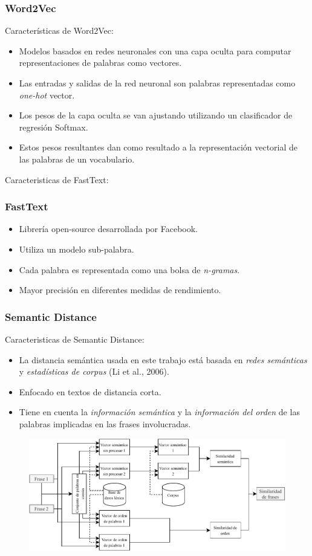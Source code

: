 \begin{frame}
	\frametitle{Word2Vec}
	Características de Word2Vec:
	\bigskip
	\begin{itemize}[<*>]
		\item Modelos basados en redes neuronales con una capa oculta para computar representaciones de palabras como vectores.
		\item Las entradas y salidas de la red neuronal son palabras representadas como \textit{one-hot} vector.
		\item Los pesos de la capa oculta se van ajustando utilizando un clasificador de regresión Softmax.
		\item Estos pesos resultantes dan como resultado a la representación vectorial de las palabras de un vocabulario.
	\end{itemize}
\end{frame}

\begin{frame}
	Caracteristicas de FastText:
	\bigskip
	\frametitle{FastText}
	\begin{itemize}[<*>]
		\item Librería open-source desarrollada por Facebook.
		\item Utiliza un modelo sub-palabra.
		\item Cada palabra es representada como una bolsa de \textit{n-gramas}.
		\item Mayor precisión en diferentes medidas de rendimiento.
	\end{itemize}
\end{frame}

\begin{frame}[allowframebreaks]
	\frametitle{Semantic Distance}
	Caracteristicas de Semantic Distance:
	\bigskip
	\begin{itemize}[<*>]
		\item La distancia semántica usada en este trabajo está basada en \textit{redes semánticas} y \textit{estadísticas de corpus} (Li et al., 2006).
		\item Enfocado en textos de distancia corta.
		\item Tiene en cuenta la \textit{información semántica} y la \textit{información del orden} de las palabras implicadas en las frases involucradas.
	\end{itemize}

	\begin{figure}
		\centering
		\includegraphics[width=0.7\linewidth]{../7_marco_teorico/imagenes/similaridad_sematinca_metodo}
		\label{fig:similaridadsematincametodo}
	\end{figure}
\end{frame}

